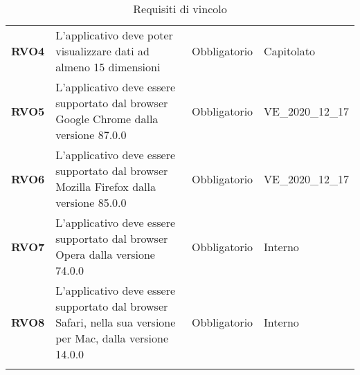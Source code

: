 \begin{longtable}[H]{| >{\raggedright\bfseries}m{20mm} | >{\raggedright}m{90mm} | >{\centering}m{25mm} | >{\centering\arraybackslash}m{30mm}|}
    RVO4
     & L'applicativo deve poter visualizzare dati ad almeno 15 dimensioni
     & Obbligatorio
     & Capitolato                                                                                                 \\

    RVO5
     & L'applicativo deve essere supportato dal browser Google Chrome dalla versione 87.0.0
     & Obbligatorio
     & VE\_2020\_12\_17                                                                                           \\

    RVO6
     & L'applicativo deve essere supportato dal browser Mozilla Firefox dalla versione 85.0.0
     & Obbligatorio
     & VE\_2020\_12\_17                                                                                           \\

    RVO7
     & L'applicativo deve essere supportato dal browser Opera dalla versione 74.0.0
     & Obbligatorio
     & Interno                                                                                                    \\

    RVO8
     & L'applicativo deve essere supportato dal browser Safari, nella sua versione per Mac, dalla versione 14.0.0
     & Obbligatorio
     & Interno                                                                                                    \\


    \hline
    \rowcolor{white}
    \caption{Requisiti di vincolo}%
    \label{tab:requisiti_di_vincolo}
\end{longtable}
